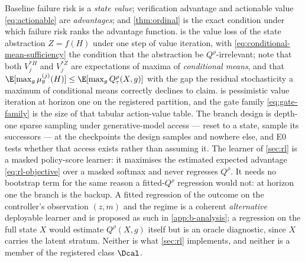 Baseline failure risk is a \emph{state value}; verification advantage and
actionable value \eqref{eq:actionable} are \emph{advantages}; and
\cref{thm:ordinal} is the exact condition under which failure risk ranks the
advantage function.   is the value loss of the state
abstraction $Z=f(H)$ under one step of value iteration, with
\eqref{eq:conditional-mean-sufficiency} the condition that the abstraction be
$Q^\rho$-irrelevant; note that both $V^{*H}_j$ and $V^{*Z}_j$ are expectations
of maxima of \emph{conditional means}, and that
$\E[\max_g\mu^{(j)}_g(H)]\le\E[\max_g Q^\rho_\tau(X,g)]$ with the gap the
residual stochasticity a maximum of conditional means correctly declines to
claim.   is pessimistic value iteration at horizon one on the
registered partition, and the gate family \eqref{eq:gate-family} is the size of
that tabular action-value table.  The branch design is depth-one sparse sampling
under generative-model access --- reset to a state, sample its successors --- at
the checkpoints the design samples and nowhere else, and E0 tests whether that
access exists rather than assuming it.  The learner of \cref{sec:rl} is a masked
policy-score learner: it maximises the estimated expected advantage
\eqref{eq:rl-objective} over a masked softmax and never regresses $Q^\rho$.  It
needs no bootstrap term for the same reason a fitted-$Q^\rho$ regression would
not: at horizon one the branch is the backup.  A fitted regression of the
outcome on the controller's observation $(z,m)$ and the regime is a coherent
\emph{alternative} deployable learner and is proposed as such in
\cref{app:b-analysis}; a regression on the full state $X$ would estimate
$Q^\rho(X,g)$ itself but is an oracle diagnostic, since $X$ carries the latent
stratum.  Neither is what \cref{sec:rl} implements, and neither is a member of
the registered class $\Dcal$.


